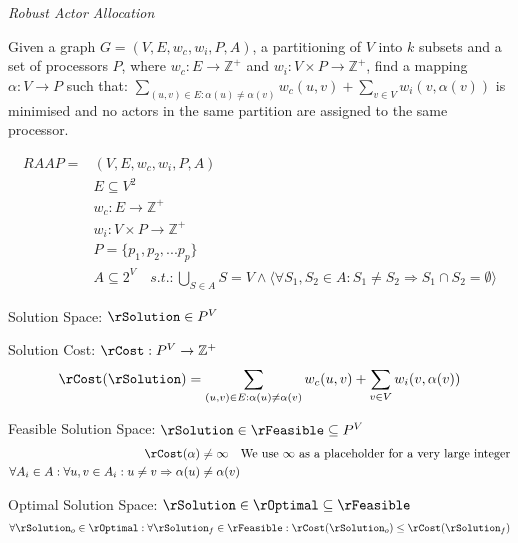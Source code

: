 \begin{definition}
{\em Robust Actor Allocation}

Given a graph $G=(V,E,w_c,w_i, P, A)$, a partitioning of $V$ into $k$ subsets and a set of processors $P$, where $w_c : E \rightarrow \mathbb{Z}^+$ and $w_i : V \times P \rightarrow \mathbb{Z}^+$, find a mapping $\alpha : V \rightarrow P$ such that:
$\displaystyle\sum\limits_{(u,v) \in E : \alpha(u) \neq \alpha(v)} w_c(u,v) + \displaystyle\sum\limits_{v \in V} w_i(v, \alpha(v))$ is minimised and no actors in the same partition are assigned to the same processor.

\begin{align}
	\nonumber RAAP = & (V,E,w_c, w_i, P, A)\\
	\nonumber & E \subseteq V^2\\
	\nonumber & w_c : E \rightarrow \mathbb{Z}^+\\
	\nonumber & w_i : V \times P \rightarrow \mathbb{Z}^+\\
	\nonumber & P = \{p_1, p_2, ...p_p\} \\
	\nonumber & A \subseteq 2^V \quad s.t. : \displaystyle\bigcup\limits_{S \in A} S = V \wedge \langle \forall S_1, S_2 \in A : S_1 \neq S_2 \Rightarrow S_1 \cap S_2 = \emptyset \rangle
\end{align}

Solution Space: $\rSolution \in P^V$

Solution Cost: $\rCost : P^V \rightarrow \mathbb{Z}^+$
\begin{align}
	\nonumber \rCost(\rSolution) = \displaystyle\sum\limits_{(u,v) \in E : \alpha(u) \neq \alpha(v)} w_c(u,v) + \displaystyle\sum\limits_{v \in V} w_i(v, \alpha(v))
\end{align}

Feasible Solution Space: $\rSolution \in \rFeasible \subseteq P^V$
\begin{align}
	\nonumber \rCost(\alpha) & \neq \infty \quad \mbox{We use $\infty$ as a placeholder for a very large integer} \\
	\nonumber \forall A_i \in A : \forall u , v \in A_i : u \neq v \Rightarrow \alpha(u) & \neq  \alpha(v)
\end{align}

Optimal Solution Space: $\rSolution \in \rOptimal \subseteq \rFeasible$
\begin{align}
	\nonumber 	\forall \rSolution_o \in \rOptimal : \forall \rSolution_f \in \rFeasible : \rCost(\rSolution_o) \leq \rCost(\rSolution_f)
\end{align}

\end{definition}

